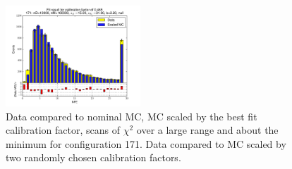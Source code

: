 \begin{figure}[htbp]
\begin{center}
\includegraphics[width=0.45\textwidth]{../FIGURES/171/FIG_Fit_result_for_calibration_factor_of_0_465.pdf} 
\caption{Data compared to nominal MC, MC scaled by the best fit calibration factor, scans of $\chi^2$ over a large range and about the minimum for configuration 171. Data compared to MC scaled by two randomly chosen calibration factors.} 
\label{tab:best_171} 
\end{center} \end{figure} 


